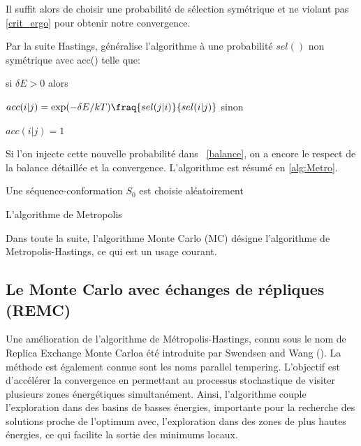 Il suffit alors de choisir une probabilité de sélection symétrique et ne violant pas \ref{crit_ergo} pour obtenir notre convergence.


Par la suite Hastings, généralise l'algorithme à une probabilité $sel()$ non symétrique avec acc() telle que:


si
$\delta E >0$
alors

$acc(i|j) = \exp(- \delta E/kT) \fraq{sel(j|i)}{sel(i|j)}$
\label{eq:Hasting}
sinon

$acc(i|j)=1$


Si l'on injecte cette nouvelle probabilité dans ~\ref{balance}, on a encore le respect de la balance détaillée et la convergence. L'algorithme est résumé en \ref{alg:Metro}.


\begin{algorithm}
  \label{alg:Metro}
  Une séquence-conformation $S_0$ est choisie aléatoirement\;
\caption{L'algorithme de Metropolis}  
\end{algorithm}


Dans toute la suite, l'algorithme Monte Carlo (MC) désigne l'algorithme de Metropolis-Hastings, ce qui est un usage courant.

\subsection{Le Monte Carlo avec échanges de répliques (REMC)}
\label{REMC}

Une amélioration de l'algorithme de Métropolis-Hastings, connu sous le nom de \og Replica Exchange Monte Carlo\fg a été introduite par Swendsen and Wang (\cite{Swendsen82}). La méthode est également connue sont les noms \og parallel tempering\fg. L'objectif est d'accélérer la convergence en permettant au processus stochastique de visiter plusieurs zones énergétiques simultanément. Ainsi, l'algorithme couple l'exploration dans des basins de basses énergies, importante pour la recherche des solutions proche de l'optimum avec, l'exploration dans des zones de plus hautes énergies, ce qui facilite la sortie des minimums locaux.

